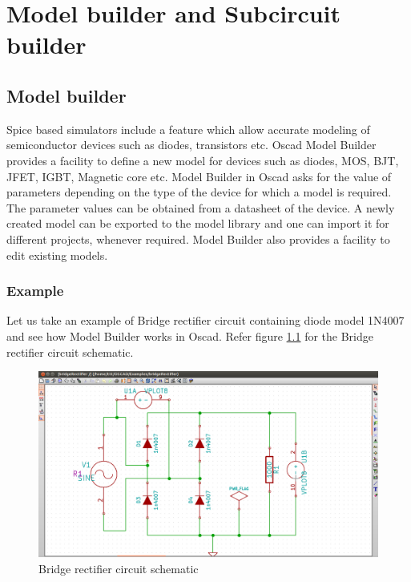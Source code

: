\chapter {Model builder and Subcircuit builder}\label{chap8}
\section {Model builder}



Spice based simulators include a feature which allow accurate modeling of semiconductor devices such as diodes, transistors etc. Oscad Model Builder provides a facility to define a new model for devices such as diodes, MOS, BJT, JFET, IGBT, Magnetic core etc. Model Builder in Oscad asks for the value of parameters depending on the type of the device for which a model is required. The parameter values can be obtained from a datasheet of the device. A newly created model can be exported to the model library and one can import it for different projects, whenever required. Model Builder also provides a facility to edit existing models. 

\subsection{Example}
Let us take an example of Bridge rectifier circuit containing diode model 1N4007 and see how Model Builder works in Oscad. Refer figure \ref{bridge-rectifier} for the Bridge rectifier circuit schematic.

\begin{figure}[t]%
\begin{center}
\includegraphics[width=1\linewidth]{figures/B-Rectifier-schematic.png}%
\caption{Bridge rectifier circuit schematic}
\label{bridge-rectifier}
\end{center}
\end{figure}

